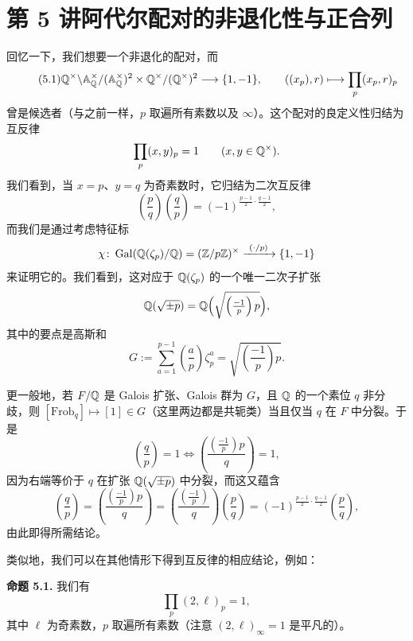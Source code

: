 \section*{第 5 讲\quad 阿代尔配对的非退化性与正合列}

回忆一下，我们想要一个非退化的配对，而
\begin{equation}\tag{5.1}
\mathbb{Q}^\times\backslash\mathbb{A}_{\mathbb{Q}}^\times/(\mathbb{A}_{\mathbb{Q}}^\times)^2\times\mathbb{Q}^\times/(\mathbb{Q}^\times)^2\longrightarrow\{1,-1\},\qquad
((x_p),r)\longmapsto\prod_p (x_p,r)_p
\end{equation}
曾是候选者（与之前一样，$p$ 取遍所有素数以及 $\infty$）。这个配对的良定义性归结为互反律
\[
\prod_p (x,y)_p=1\qquad (x,y\in\mathbb{Q}^\times).
\]
我们看到，当 $x=p$、$y=q$ 为奇素数时，它归结为二次互反律
\[
\left(\frac{p}{q}\right)\left(\frac{q}{p}\right)=(-1)^{\frac{p-1}{2}\cdot\frac{q-1}{2}},
\]
而我们是通过考虑特征标
\[
\chi\colon\Gal(\Q(\zeta_p)/\Q)=(\Z/p\Z)^\times\xrightarrow{\ (\cdot/p)\ }\{1,-1\}
\]
来证明它的。我们看到，这对应于 $\mathbb{Q}(\zeta_p)$ 的一个唯一二次子扩张
\[
\mathbb{Q}(\sqrt{\pm p})=\mathbb{Q}\Bigl(\sqrt{\left(\tfrac{-1}{p}\right)p}\Bigr),
\]
其中的要点是高斯和
\[
G:=\sum_{a=1}^{p-1}\left(\frac{a}{p}\right)\zeta_p^a=\sqrt{\left(\frac{-1}{p}\right)p}.
\]

更一般地，若 $F/\mathbb{Q}$ 是 Galois 扩张、Galois 群为 $G$，且 $\mathbb{Q}$ 的一个素位 $q$ 非分歧，则 $[\mathrm{Frob}_q]\mapsto[1]\in G$（这里两边都是共轭类）当且仅当 $q$ 在 $F$ 中分裂。于是
\[
\left(\frac{q}{p}\right)=1\iff
\left(\frac{\left(\tfrac{-1}{p}\right)p}{q}\right)=1,
\]
因为右端等价于 $q$ 在扩张 $\mathbb{Q}(\sqrt{\pm p})$ 中分裂，而这又蕴含
\[
\left(\frac{q}{p}\right)=\left(\frac{\left(\tfrac{-1}{p}\right)p}{q}\right)
=\left(\frac{\left(\tfrac{-1}{p}\right)}{q}\right)\left(\frac{p}{q}\right)
=(-1)^{\frac{p-1}{2}\cdot\frac{q-1}{2}}\left(\frac{p}{q}\right),
\]
由此即得所需结论。

类似地，我们可以在其他情形下得到互反律的相应结论，例如：

\textbf{命题 5.1.} 我们有
\[
\prod_p (2,\ell)_p=1,
\]
其中 $\ell$ 为奇素数，$p$ 取遍所有素数（注意 $(2,\ell)_\infty=1$ 是平凡的）。

